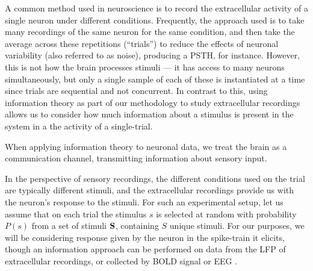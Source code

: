 A common method used in neuroscience is to record the extracellular activity of a single neuron under different conditions.
Frequently, the approach used is to take many recordings of the same neuron for the same condition, and then take the average across these repetitions (``trials'') to reduce the effects of neuronal variability (also referred to as noise), producing a \ac{PSTH}, for instance.
However, this is not how the brain processes stimuli --- it has access to many neurons simultaneously, but only a single sample of each of these is instantiated at a time since trials are sequential and not concurrent.
In contrast to this, using information theory as part of our methodology to study extracellular recordings allows us to consider how much information about a stimulus is present in the system in a the activity of a single-trial.

When applying information theory to neuronal data, we treat the brain as a communication channel, transmitting information about sensory input.

In the perspective of sensory recordings, the different conditions used on the trial are typically different stimuli, and the extracellular recordings provide us with the neuron's response to the stimuli.
For such an experimental setup, let us assume that on each trial the stimulus $s$ is selected at random with probability $P(s)$ from a set of stimuli $\mathbf{S}$, containing $S$ unique stimuli.
For our purposes, we will be considering response given by the neuron in the spike-train it elicits, though an information approach can be performed on data from the \ac{LFP} of extracellular recordings, or collected by \ac{BOLD} signal or \ac{EEG} \citep{Magri2009,Quiroga2009}.

